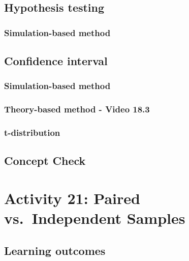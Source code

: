 \documentclass[
]{report}
\begin{document}
\subsection*{Hypothesis testing}\label{hypothesis-testing-5}

\subsubsection*{Simulation-based method}\label{simulation-based-method-6}

\subsection*{Confidence interval}\label{confidence-interval-3}

\subsubsection*{Simulation-based method}\label{simulation-based-method-7}

\subsubsection*{Theory-based method - Video 18.3}\label{theory-based-method---video-18.3}

\subsubsection*{t-distribution}\label{t-distribution-2}

\subsection{Concept Check}\label{concept-check-9}

\section{Activity 21: Paired vs.~Independent Samples}\label{activity-21-paired-vs.-independent-samples}

\subsection{Learning outcomes}\label{learning-outcomes-23}
\end{document}
